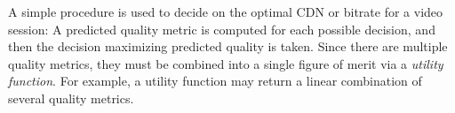  A simple procedure is used to decide on the optimal CDN or bitrate for a video session: A predicted quality metric is computed for each possible decision, and then the decision maximizing predicted quality is taken.  Since there are multiple quality metrics, they must be combined into a single figure of merit via a \emph{utility function}.  For example, a utility function may return a linear combination of several quality metrics.
